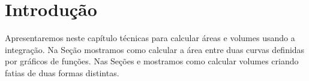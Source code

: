 \section{Introdução}

Apresentaremos neste capítulo técnicas para calcular áreas e volumes usando
a integração.
Na Seção  mostramos como calcular a área entre
duas curvas definidas por gráficos de funções.
Nas Seções  e
 mostramos como calcular volumes
criando fatias de duas formas distintas.

